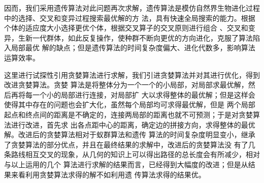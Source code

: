 \documentclass[fontset=windows,a4paper,12pt]{ctexart}
\begin{document}
	    因而，我们采用遗传算法对此问题再次求解，遗传算法是模仿自然界生物进化过程中的选择、交叉和变异过程搜索最优解的方
	    法，具有快速全局搜索的能力。根据个体的适应度大小选择更优个体，根据交叉算子的交叉原则进行组合
	    、交叉和变异，生新一代群体，如此反复操作，使种群不断向更优的方向进化，克服了算法陷入局部最优
	    解的缺点；但是遗传算法的时间复杂度偏大、进化代数多，影响算法运算效率。
	    
	    这里进行试探性引用贪婪算法进行求解，我们引进贪婪算法并对其进行优化，得到改进贪婪算法。贪婪
	    算法是将整体分为一个一个的小局部，对局部求最优解，然后再将每一个小的局部进行连接，对局部扩
	    大以求得整体的最优解；但是这样会使得其中存在的问题也会扩大化，虽然每个局部均可求得最优解，但是
	    两个局部起点和终点间的距离是不确定的，连接两局部的距离也就不可预测；于是对贪婪算法进行改进，首先求
	    出各点距中心的距离，确定边的拼接方向，求得整体的最优解。改进后的贪婪算法相对于蚁群算法和遗传
	    算法的时间复杂度明显变小，继承了贪婪算法的部分优点，并且在最终结果的求解中，改进后的贪婪算法没
	    有了几条路线相互交叉的现象，从几何的知识上可以得出路径的总长度会有所减少，相对与以上运用的几个
	    算法进行求解的结果而言，已经得到大幅度的改进；但是从结果来看利用贪婪算法求得的解不如利用遗
	    传算法求得的结果优。
  \newpage
  
  
\end{document}
